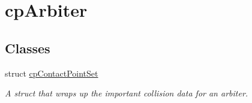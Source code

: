 \hypertarget{group__cpArbiter}{}\section{cp\+Arbiter}
\label{group__cpArbiter}
\subsection*{Classes}
\begin{DoxyCompactItemize}
\item 
struct \hyperlink{structcpContactPointSet}{cp\+Contact\+Point\+Set}
\begin{DoxyCompactList}\small\item\em A struct that wraps up the important collision data for an arbiter. \end{DoxyCompactList}\end{DoxyCompactItemize}
